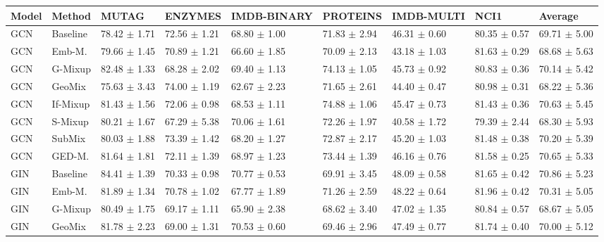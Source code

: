 \begin{table}
\centering
\begin{tabular}{lllllllll}
\toprule
\textbf{Model} & \textbf{Method} & \textbf{MUTAG} & \textbf{ENZYMES} & \textbf{IMDB-BINARY} & \textbf{PROTEINS} & \textbf{IMDB-MULTI} & \textbf{NCI1} & \textbf{Average}\\
\midrule
GCN & Baseline & 78.42 $\pm$ 1.71 & 72.56 $\pm$ 1.21 & 68.80 $\pm$ 1.00 & 71.83 $\pm$ 2.94 & 46.31 $\pm$ 0.60 & 80.35 $\pm$ 0.57 & 69.71 $\pm$ 5.00\\
GCN & Emb-M. & 79.66 $\pm$ 1.45 & 70.89 $\pm$ 1.21 & 66.60 $\pm$ 1.85 & 70.09 $\pm$ 2.13 & 43.18 $\pm$ 1.03 & 81.63 $\pm$ 0.29 & 68.68 $\pm$ 5.63\\
GCN & G-Mixup & 82.48 $\pm$ 1.33 & 68.28 $\pm$ 2.02 & 69.40 $\pm$ 1.13 & 74.13 $\pm$ 1.05 & 45.73 $\pm$ 0.92 & 80.83 $\pm$ 0.36 & 70.14 $\pm$ 5.42\\
GCN & GeoMix & 75.63 $\pm$ 3.43 & 74.00 $\pm$ 1.19 & 62.67 $\pm$ 2.23 & 71.65 $\pm$ 2.61 & 44.40 $\pm$ 0.47 & 80.98 $\pm$ 0.31 & 68.22 $\pm$ 5.36\\
GCN & If-Mixup & 81.43 $\pm$ 1.56 & 72.06 $\pm$ 0.98 & 68.53 $\pm$ 1.11 & 74.88 $\pm$ 1.06 & 45.47 $\pm$ 0.73 & 81.43 $\pm$ 0.36 & 70.63 $\pm$ 5.45\\
GCN & S-Mixup & 80.21 $\pm$ 1.67 & 67.29 $\pm$ 5.38 & 70.06 $\pm$ 1.61 & 72.26 $\pm$ 1.97 & 40.58 $\pm$ 1.72 & 79.39 $\pm$ 2.44 & 68.30 $\pm$ 5.93\\
GCN & SubMix & 80.03 $\pm$ 1.88 & 73.39 $\pm$ 1.42 & 68.20 $\pm$ 1.27 & 72.87 $\pm$ 2.17 & 45.20 $\pm$ 1.03 & 81.48 $\pm$ 0.38 & 70.20 $\pm$ 5.39\\
GCN & GED-M. & 81.64 $\pm$ 1.81 & 72.11 $\pm$ 1.39 & 68.97 $\pm$ 1.23 & 73.44 $\pm$ 1.39 & 46.16 $\pm$ 0.76 & 81.58 $\pm$ 0.25 & 70.65 $\pm$ 5.33\\
GIN & Baseline & 84.41 $\pm$ 1.39 & 70.33 $\pm$ 0.98 & 70.77 $\pm$ 0.53 & 69.91 $\pm$ 3.45 & 48.09 $\pm$ 0.58 & 81.65 $\pm$ 0.42 & 70.86 $\pm$ 5.23\\
GIN & Emb-M. & 81.89 $\pm$ 1.34 & 70.78 $\pm$ 1.02 & 67.77 $\pm$ 1.89 & 71.26 $\pm$ 2.59 & 48.22 $\pm$ 0.64 & 81.96 $\pm$ 0.42 & 70.31 $\pm$ 5.05\\
GIN & G-Mixup & 80.49 $\pm$ 1.75 & 69.17 $\pm$ 1.11 & 65.90 $\pm$ 2.38 & 68.62 $\pm$ 3.40 & 47.02 $\pm$ 1.35 & 80.84 $\pm$ 0.57 & 68.67 $\pm$ 5.05\\
GIN & GeoMix & 81.78 $\pm$ 2.23 & 69.00 $\pm$ 1.31 & 70.53 $\pm$ 0.60 & 69.46 $\pm$ 2.96 & 47.49 $\pm$ 0.77 & 81.74 $\pm$ 0.40 & 70.00 $\pm$ 5.12\\

\end{tabular}
\end{table}
